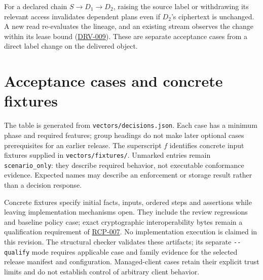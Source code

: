 \documentclass[11pt,a4paper]{article}
\newcommand{\code}[1]{{\small\nolinkurl{#1}}}
\newcommand{\rr}[1]{\hyperlink{req:#1}{#1}}
\begin{document}
For a declared chain $S \rightarrow D_1 \rightarrow D_2$, raising the source label or withdrawing its relevant access invalidates dependent plans even if $D_2$'s ciphertext is unchanged. A new read re-evaluates the lineage, and an existing stream observes the change within its lease bound (\rr{DRV-009}). These are separate acceptance cases from a direct label change on the delivered object.


\section{Acceptance cases and concrete fixtures}\label{app:vectors}
The table is generated from \texttt{vectors/decisions.json}. Each case has a minimum phase and required features; group headings do not make later optional cases prerequisites for an earlier release. The superscript $f$ identifies concrete input fixtures supplied in \texttt{vectors/fixtures/}. Unmarked entries remain \code{scenario_only}: they describe required behavior, not executable conformance evidence. Expected names may describe an enforcement or storage result rather than a decision response.

Concrete fixtures specify initial facts, inputs, ordered steps and assertions while leaving implementation mechanisms open. They include the review regressions and baseline policy case; exact cryptographic interoperability bytes remain a qualification requirement of \rr{RCP-007}. No implementation execution is claimed in this revision. The structural checker validates these artifacts; its separate \code{--qualify} mode requires applicable case and family evidence for the selected release manifest and configuration. Managed-client cases retain their explicit trust limits and do not establish control of arbitrary client behavior.

\end{document}

